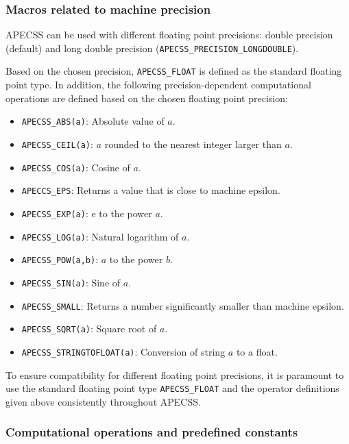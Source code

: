 \subsubsection{Macros related to machine precision}

APECSS can be used with different floating point precisions: double precision (default) and long double precision ({\tt APECSS\_PRECISION\_LONGDOUBLE}).

Based on the chosen precision, {\tt APECSS\_FLOAT} is defined as the standard floating point type. In addition, the following precision-dependent computational operations are defined based on the chosen floating point precision:\vspace{-1em}
\begin{itemize}[noitemsep]
  \item {\tt APECSS\_ABS(a)}: Absolute value of $a$.
  \item {\tt APECSS\_CEIL(a)}: $a$ rounded to the nearest integer larger than $a$.
  \item {\tt APECSS\_COS(a)}: Cosine of $a$.
  \item {\tt APECCS\_EPS}: Returns a value that is close to machine epsilon.
  \item {\tt APECSS\_EXP(a)}: $\text{e}$ to the power $a$.
  \item {\tt APECSS\_LOG(a)}: Natural logarithm of $a$.
  \item {\tt APECSS\_POW(a,b)}: $a$ to the power $b$.
  \item {\tt APECSS\_SIN(a)}: Sine of $a$.
  \item {\tt APECSS\_SMALL}: Returns a number significantly smaller than machine epsilon.
  \item {\tt APECSS\_SQRT(a)}: Square root of $a$.
  \item {\tt APECSS\_STRINGTOFLOAT(a)}: Conversion of string $a$ to a float.
\end{itemize}
To ensure compatibility for different floating point precisions, it is paramount to use the standard floating point type {\tt APECSS\_FLOAT} and the operator definitions given above consistently throughout APECSS.

\subsubsection{Computational operations and predefined constants}

